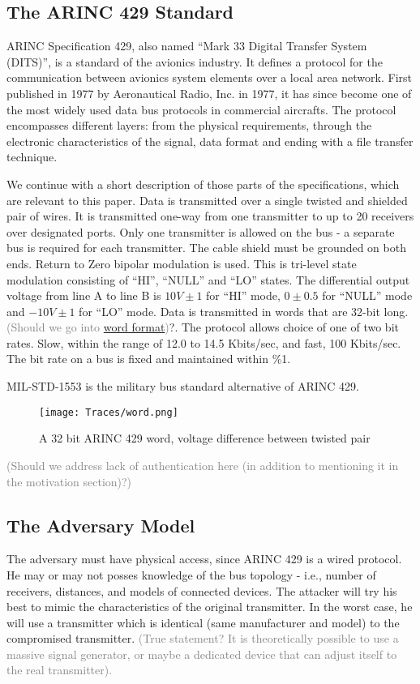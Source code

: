 \documentclass[conference]{IEEEtran}
\begin{document}
\subsection{The ARINC 429 Standard}
  ARINC Specification 429, also named ``Mark 33 Digital Transfer System (DITS)'', is a standard of the avionics industry. It defines a protocol for the communication between avionics system elements over a local area network. First published in 1977 by Aeronautical Radio, Inc. in 1977, it has since become one of the most widely used data bus protocols in commercial aircrafts. The protocol encompasses different layers: from the physical requirements, through the electronic characteristics of the signal, data format and ending with a file transfer technique.

  We continue with a short description of those parts of the specifications, which are relevant to this paper.
  Data is transmitted over a single twisted and shielded pair of wires. It is transmitted one-way from one transmitter to up to 20 receivers over designated ports. Only one transmitter is allowed on the bus - a separate bus is required for each transmitter. The cable shield must be grounded on both ends. Return to Zero bipolar modulation is used. This is tri-level state modulation consisting of ``HI'', ``NULL'' and ``LO'' states. The differential output voltage from line A to line B is $10V \pm 1$ for ``HI'' mode, $0 \pm 0.5$ for ``NULL'' mode and $-10V \pm 1$ for ``LO'' mode. Data is transmitted in words that are 32-bit long. \textcolor{gray}{(Should we go into \href{https://en.wikipedia.org/wiki/ARINC_429\#Word_format}{word format})}?. The protocol allows choice of one of two bit rates. Slow, within the range of 12.0 to 14.5 Kbits/sec, and fast, 100 Kbits/sec. The bit rate on a bus is fixed and maintained within \%1.
  
  MIL-STD-1553 is the military bus standard alternative of ARINC 429.
  
  \begin{figure}[t]
    \centering
    \texttt{[image: Traces/word.png]}
    \caption{A 32 bit ARINC 429 word, voltage difference between twisted pair}
    \label{fig:word_example}
  \end{figure}
  
  \textcolor{gray}{(Should we address lack of authentication here (in addition to mentioning it in the motivation section)?)}

\subsection{The Adversary Model}
  The adversary must have physical access, since ARINC 429 is a wired protocol. He may or may not posses knowledge of the bus topology - i.e., number of receivers, distances, and models of connected devices. The attacker will try his best to mimic the characteristics of the original transmitter. In the worst case, he will use a transmitter which is identical (same manufacturer and model) to the compromised transmitter. \textcolor{gray}{(True statement? It is theoretically possible to use a massive signal generator, or maybe a dedicated device that can adjust itself to the real transmitter).}
\end{document}
